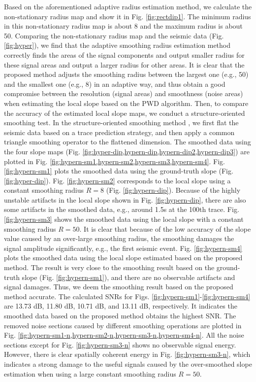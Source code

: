 Based on the aforementioned adaptive radius estimation method, we calculate the non-stationary radius map and show it in Fig. \ref{fig:rectdip1}. The minimum radius in this non-stationary radius map is about 8 and the maximum radius is about 50. Comparing the non-stationary radius map and the seismic data (Fig. \ref{fig:hyper}), we find that the adaptive smoothing radius estimation method correctly finds the areas of the signal components and output smaller radius for these signal areas and output a larger radius for other areas. It is clear that the proposed method adjusts the smoothing radius between the largest one (e.g., 50) and the smallest one (e.g., 8) in an adaptive way, and thus obtain a good compromise between the resolution (signal areas) and smoothness (noise areas) when estimating the local slope based on the PWD algorithm. Then, to compare the accuracy of the estimated local slope maps, we conduct a structure-oriented smoothing test. In the structure-oriented smoothing method \cite[]{sosvmf}, we first flat the seismic data based on a trace prediction strategy, and then apply a common triangle smoothing operator to the flattened dimension. 
The smoothed data using the four slope maps (Fig. \ref{fig:hyper-dip,hypern-dip,hypern-dip2,hypern-dip3}) are plotted in Fig. \ref{fig:hypern-sm1,hypern-sm2,hypern-sm3,hypern-sm4}. Fig. \ref{fig:hypern-sm1} plots the smoothed data using the ground-truth slope (Fig. \ref{fig:hyper-dip}). Fig. \ref{fig:hypern-sm2} corresponds to the local slope using a constant smoothing radius $R=8$ (Fig. \ref{fig:hypern-dip}). Because of the highly unstable artifacts in the local slope shown in Fig. \ref{fig:hypern-dip}, there are also some artifacts in the smoothed data, e.g., around 1.5s at the 100th trace.  Fig. \ref{fig:hypern-sm3} shows the smoothed data using the local slope with a constant smoothing radius $R=50$. It is clear that because of the low accuracy of the slope value caused by an over-large smoothing radius, the smoothing damages the signal amplitude significantly, e.g., the first seismic event. Fig.  \ref{fig:hypern-sm4} plots the smoothed data using the local slope estimated based on the proposed method. The result is very close to the smoothing result based on the ground-truth slope (Fig. \ref{fig:hypern-sm1}), and there are no observable artifacts and signal damages. Thus, we deem the smoothing result based on the proposed method accurate. The calculated SNRs for Figs. \ref{fig:hypern-sm1}-\ref{fig:hypern-sm4} are 13.73 dB, 11.80 dB, 10.71 dB, and 13.11 dB, respectively. It indicates  the smoothed data based on the proposed method obtains the highest SNR.  The removed noise sections caused by different smoothing operations are plotted in Fig. \ref{fig:hypern-sm1-n,hypern-sm2-n,hypern-sm3-n,hypern-sm4-n}. All the noise sections except for Fig. \ref{fig:hypern-sm3-n} shows no observable signal energy. However, there is  clear spatially coherent energy in Fig. \ref{fig:hypern-sm3-n}, which indicates a strong damage to the useful signals caused by the over-smoothed slope estimation when using a large constant smoothing radius $R=50$.

